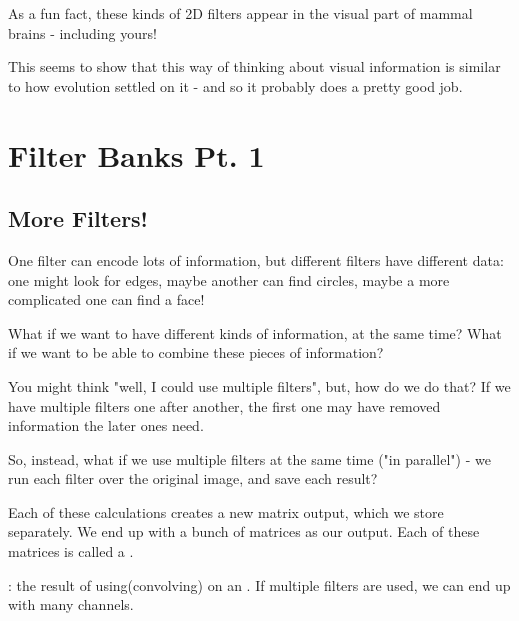         As a fun fact, these kinds of 2D filters appear in the visual part of mammal brains - including yours! 
        
        This seems to show that this way of thinking about visual information is similar to how evolution settled on it - and so it probably does a pretty good job.
        






\section{Filter Banks Pt. 1}

    \subsection{More Filters!}
    
        One filter can encode lots of information, but different filters have different data: one might look for edges, maybe another can find circles, maybe a more complicated one can find a face!
        
        What if we want to have different kinds of information, at the same time? What if we want to be able to combine these pieces of information?
        
        You might think "well, I could use multiple filters", but, how do we do that? If we have multiple filters one after another, the first one may have removed information the later ones need.
        
        So, instead, what if we use multiple filters at the same time ("in parallel") - we run each filter over the original image, and save each result?
        
        Each of these calculations creates a new matrix output, which we store separately. We end up with a bunch of matrices as our output. Each of these matrices is called a .\\
        
        \begin{definition}
            : the result of using(convolving)  on an . If multiple filters are used, we can end up with many channels.
        \end{definition}
        
        
        
        
        
